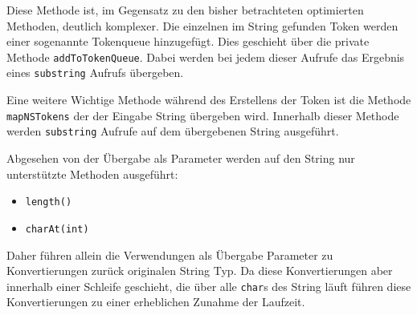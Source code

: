 Diese Methode ist, im Gegensatz zu den bisher betrachteten optimierten Methoden, deutlich
komplexer. Die einzelnen im String gefunden Token werden einer sogenannte Tokenqueue 
hinzugefügt. Dies geschieht über die private Methode \texttt{addToTokenQueue}. Dabei 
werden bei jedem dieser Aufrufe das Ergebnis eines \texttt{substring} Aufrufs übergeben.

Eine weitere Wichtige Methode während des Erstellens der Token ist die Methode \texttt{mapNSTokens}
der der Eingabe String übergeben wird. Innerhalb dieser Methode werden \texttt{substring}  
Aufrufe auf dem übergebenen String ausgeführt.

Abgesehen von der Übergabe als Parameter werden auf den String nur unterstützte Methoden 
ausgeführt:

\begin{itemize}
 	\item \texttt{length()}
 	\item \texttt{charAt(int)}
\end{itemize} 

Daher führen allein die Verwendungen als Übergabe Parameter zu Konvertierungen zurück originalen
String Typ. Da diese Konvertierungen aber innerhalb einer Schleife geschieht, die über alle \texttt{char}s
des String läuft führen diese Konvertierungen zu einer erheblichen Zunahme der Laufzeit.  
